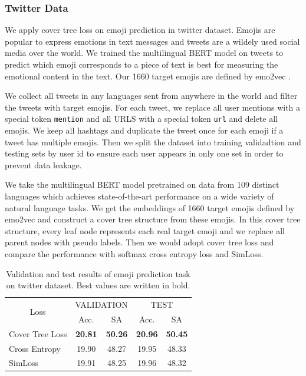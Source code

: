 \documentclass[twoside]{article}
\theoremstyle{definition}
\begin{document}
\subsubsection{Twitter Data}

We apply cover tree loss on emoji prediction in twitter dataset. 
Emojis are popular to express emotions in text messages and tweets are a wildely used social media over the world. 
We trained the multilingual BERT model on tweets to predict which emoji corresponds to a piece of text is best for measuring the emotional content in the text. 
Our 1660 target emojis are defined by emo2vec \cite{Eisner2016emoji2vecLE}.

We collect all tweets \cite{Izbicki2019GeolocatingTI} in any languages sent from anywhere in the world and filter the tweets with target emojis. 
For each tweet, we replace all user mentions with a special token \texttt{\text{<}mention\text{>}} and all URLS with a special token \texttt{\text{<}url\text{>}} and delete all emojis. 
We keep all hashtags and duplicate the tweet once for each emoji if a tweet has multiple emojis. 
Then we split the dataset into training validadtion and testing sets by user id to ensure each user appears in only one set in order to prevent data leakage.

We take the multilingual BERT model \cite{Feng2020LanguageagnosticBS} pretrained on data from 109 distinct languages which achieves state-of-the-art performance on a wide variety of natural language tasks. 
We get the embeddings of 1660 target emojis defined by emo2vec and construct a cover tree structure from these emojis. 
In this cover tree structure, every leaf node represents each real target emoji and we replace all parent nodes with pseudo labels. 
Then we would adopt cover tree loss and compare the performance with softmax cross entropy loss and SimLoss.

\begin{table}[h]
\small
\caption{Validation and test results of emoji prediction task on twitter dataset. Best values are written in bold.} \label{twitter}
\begin{center}
\begin{tabular}{@{}lcccc@{}}
\toprule
\multicolumn{1}{c}{\multirow{2}{*}{Loss}} & \multicolumn{2}{c}{VALIDATION} & \multicolumn{2}{c}{TEST}       \\ \cmidrule(l){2-5} 
\multicolumn{1}{c}{}                      & Acc.       & SA       & Acc.      & SA             \\ \cmidrule(r){1-1}
Cover Tree Loss                           &   \textbf{20.81}    &   \textbf{50.26}  &  \textbf{20.96}    &   \textbf{50.45}        \\
Cross Entropy                             &   19.90    &   48.27  &  19.95    &   48.33        \\
SimLoss                                   &   19.91    &   48.25  &  19.96    &   48.32         \\ \bottomrule
\end{tabular}
\end{center}
\end{table}
\end{document}
